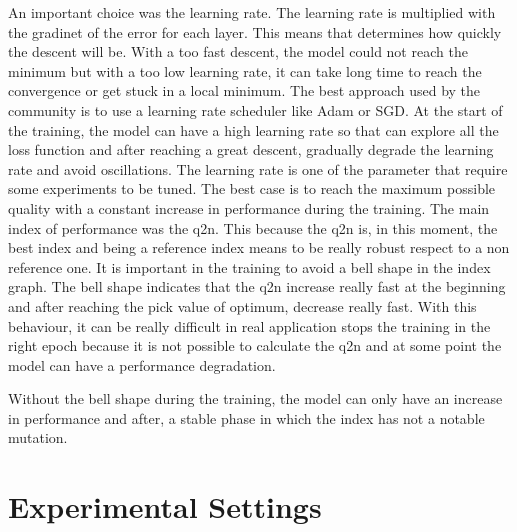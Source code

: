 \documentclass[12pt]{report}
\begin{document}
An important choice was the learning rate. The learning rate is multiplied with the gradinet of the error for each layer.
This means that determines how quickly the descent will be. With a too fast descent, the model could not reach the minimum
but with a too low learning rate, it can take long time to reach the convergence or get stuck in a local minimum.
The best approach used by the community is to use a learning rate scheduler like Adam or SGD.
At the start of the training, the model can have a high learning rate so that can explore all the loss function and after 
reaching a great descent, gradually degrade the learning rate and avoid oscillations.
The learning rate is one of the parameter that require some experiments to be tuned.
The best case is to reach the maximum possible quality with a constant increase in performance during the training.
The main index of performance was the q2n. This because the q2n is, in this moment, the best index and being a reference index means to be really robust respect to 
a non reference one. 
It is important in the training to avoid a bell shape in the index graph. The bell shape indicates that the q2n increase really fast at the beginning and
after reaching the pick value of optimum, decrease really fast. 
With this behaviour, it can be really difficult in real application stops the training in the right epoch because
it is not possible to calculate the q2n and at some point the model can have a performance degradation.

Without the bell shape during the training, the model can only have an increase in performance and after, a stable phase in which the index has not a notable mutation.


\section{Experimental Settings}
\end{document}
